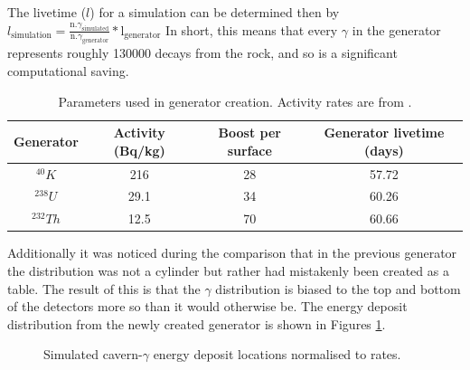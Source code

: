\par
The livetime ($l$) for a simulation can be determined then by $l_{\text{simulation}} = \frac{\text{n.} \gamma_{\text{simulated}}}{\text{n.} \gamma_{\text{generator}}} * \text{l}_{\text{generator}}$
In short, this means that every $\gamma$ in the generator represents roughly 130000 decays from the rock, and so is a significant computational saving.


\begin{table}[!htbp]
    \centering
    \begin{tabular}{c|c|c|c}
        Generator    & Activity (Bq/kg) & Boost per surface & Generator livetime (days)  \\ \hline
        ${}^{40}K$   & 216              & 28                & 57.72                      \\
        ${}^{238}U$  & 29.1             & 34                & 60.26                      \\
        ${}^{232}Th$ & 12.5             & 70                & 60.66
    \end{tabular}
    \caption{Parameters used in generator creation. Activity rates are from \cite{LZ_Gamma_Ray_Background_ref}.}
    \label{tab:cavern_gamma_generator_parameters}
\end{table}





\par
Additionally it was noticed during the comparison that in the previous generator the distribution was not a cylinder but rather had mistakenly been created as a table.
The result of this is that the $\gamma$ distribution is biased to the top and bottom of the detectors more so than it would otherwise be.
The energy deposit distribution from the newly created generator is shown in Figures \ref{fig:cavern_gamma_position_distribution}.

\begin{figure}
    \centering
    \resizebox{\textwidth}{!}{

}
    \caption{Simulated cavern-$\gamma$ energy deposit locations normalised to rates.}
    \label{fig:cavern_gamma_position_distribution}
\end{figure}
